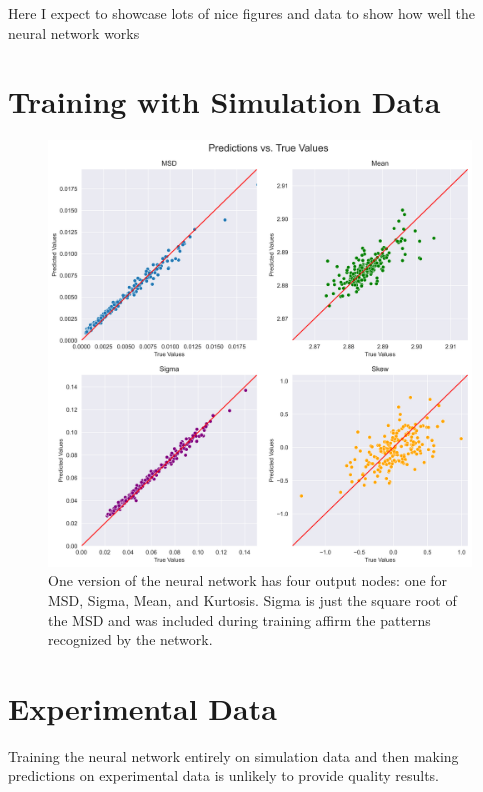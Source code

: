 
Here I expect to showcase lots of nice figures and data to show how well the neural network works

\section{Training with Simulation Data}

\begin{figure}
    \centering
    \includegraphics[width=\linewidth]{Chapters/Figures/pa_train-test (3).png}
    \caption{One version of the neural network has four output nodes: one for MSD, Sigma, Mean, and Kurtosis. Sigma is just the square root of the MSD and was included during training affirm the patterns recognized by the network.}
    \label{fig:train-test-split-all4}
\end{figure}

\section{Experimental Data} \label{ch:results}
Training the neural network entirely on simulation data and then making predictions on experimental data is unlikely to provide quality results. 


